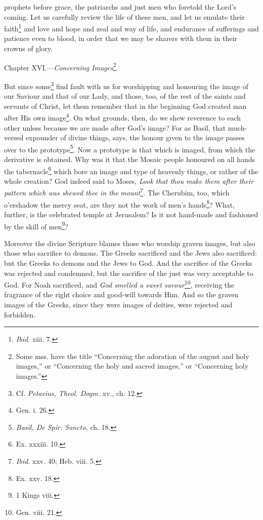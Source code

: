 prophets before grace, the patriarchs and just men who foretold the Lord’s coming. Let us carefully review the life of these men, and let us emulate their faith\footnote{\emph{Ibid.} xiii. 7.} and love and hope and zeal and way of life, and endurance of sufferings and patience even to blood, in order that we may be sharers with them in their crowns of glory.


Chapter XVI.—\emph{Concerning Images}\footnote{Some mss. have the title “Concerning the adoration of the august and holy images,” or “Concerning the holy and sacred images,” or “Concerning holy images.”}.

But since some\footnote{Cf. \emph{Petavius, Theol. Dogm. }xv., ch. 12.} find fault with us for worshipping and honouring the image of our Saviour and that of our Lady, and those, too, of the rest of the saints and servants of Christ, let them remember that in the beginning God created man after His own image\footnote{Gen. i. 26.}. On what grounds, then, do we shew reverence to each other unless because we are made after God’s image? For as Basil, that much-versed expounder of divine things, says, the honour given to the image passes over to the prototype\footnote{\emph{Basil, De Spir. Sancto, }ch. 18.}. Now a prototype is that which is imaged, from which the derivative is obtained. Why was it that the Mosaic people honoured on all hands the tabernacle\footnote{Ex. xxxiii. 10.} which bore an image and type of heavenly things, or rather of the whole creation? God indeed said to Moses, \emph{Look that thou make them after their pattern which was shewed thee in the mount}\footnote{\emph{Ibid. }xxv. 40; Heb. viii. 5.}. The Cherubim, too, which o’ershadow the mercy seat, are they not the work of men’s hands\footnote{Ex. xxv. 18.}? What, further, is the celebrated temple at Jerusalem? Is it not hand-made and fashioned by the skill of men\footnote{1 Kings viii.}?

Moreover the divine Scripture blames those who worship graven images, but also those who sacrifice to demons. The Greeks sacrificed and the Jews also sacrificed: but the Greeks to demons and the Jews to God. And the sacrifice of the Greeks was rejected and condemned, but the sacrifice of the just was very acceptable to God. For Noah sacrificed, and \emph{God smelled a sweet savour}\footnote{Gen. viii. 21.}, receiving the fragrance of the right choice and good-will towards Him. And so the graven images of the Greeks, since they were images of deities, were rejected and forbidden.

